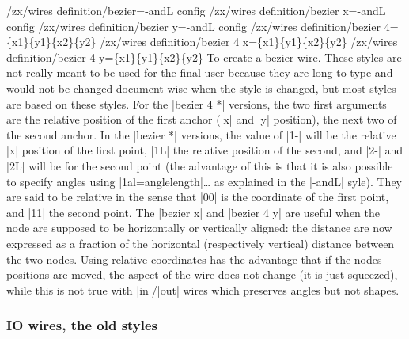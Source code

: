 \documentclass[a4paper,doc2]{ltxdoc} %
\begin{document}
{\begin{pgfmanualentry}
  \makeatletter
  \def\extrakeytext{style, }
  \extractkey/zx/wires definition/bezier=-andL config \@nil%
  \extractkey/zx/wires definition/bezier x=-andL config \@nil%
  \extractkey/zx/wires definition/bezier y=-andL config \@nil%
  \extractkey/zx/wires definition/bezier 4=\{x1\}\{y1\}\{x2\}\{y2\} \@nil%
  \extractkey/zx/wires definition/bezier 4 x=\{x1\}\{y1\}\{x2\}\{y2\} \@nil%
  \extractkey/zx/wires definition/bezier 4 y=\{x1\}\{y1\}\{x2\}\{y2\} \@nil%
  \makeatother
  \pgfmanualbody
  To create a bezier wire. These styles are not really meant to be used for the final user because they are long to type and would not be changed document-wise when the style is changed, but most styles are based on these styles. For the |bezier 4 *| versions, the two first arguments are the relative position of the first anchor (|x| and |y| position), the next two of the second anchor. In the |bezier *| versions, the value of |1-| will be the relative |x| position of the first point, |1L| the relative position of the second, and |2-| and |2L| will be for the second point (the advantage of this is that it is also possible to specify angles using |1al={angle}{length}|\dots{} as explained in the |-andL| syle). They are said to be relative in the sense that |{0}{0}| is the coordinate of the first point, and |{1}{1}| the second point. The |bezier x| and |bezier 4 y| are useful when the node are supposed to be horizontally or vertically aligned: the distance are now expressed as a fraction of the horizontal (respectively vertical) distance between the two nodes. Using relative coordinates has the advantage that if the nodes positions are moved, the aspect of the wire does not change (it is just squeezed), while this is not true with |in|/|out| wires which preserves angles but not shapes.
\end{pgfmanualentry}


\subsubsection{IO wires, the old styles}\label{subsub:IOwires}

}
\end{document}
